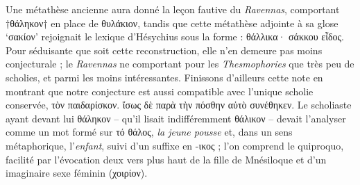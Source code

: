 \documentclass[12pt]{book}%
\newcommand{\italique}[1]{\textit{#1}}%
\newcommand{\citComm}[1]{\begin{quoting}[vskip=0pt] #1 \end{quoting}}%
\newcommand{\francais}[1]{{\policeFr #1}}%
\newcommand{\marqueur}[1]{\textsuperscript{#1}}%
\newenvironment{groupe}{%
\pstart%
\ledgroup%
}{%
\pend %
}%
\begin{document}
\begin{pages}
\begin{Leftside}
\begin{groupe}
{{Une métathèse ancienne aura donné la leçon fautive du \italique{Ravennas}, comportant †θάληκον† en place de θυλάκιον, tandis que cette métathèse adjointe à sa glose `σακίον' rejoignait le lexique d'Hésychius sous la forme : θάλλικα· σάκκου εἶδος. 
Pour séduisante que soit cette reconstruction, elle n'en demeure pas moins conjecturale ; le \italique{Ravennas} ne comportant pour les \italique{Thesmophories} que très peu de scholies, et parmi les moins intéressantes.
Finissons d'ailleurs cette note en montrant que notre conjecture est aussi compatible avec l'unique scholie conservée, τὸν παιδαρίσκον. ἴσως δὲ παρὰ τὴν πόσθην αὐτὸ συνέθηκεν. Le scholiaste ayant devant lui θάληκον -- qu'il lisait indifféremment θάλικον -- devait l'analyser comme un mot formé sur τό θάλος, \italique{la jeune pousse} et, dans un sens métaphorique, l'\italique{enfant}, suivi d'un suffixe en -ικος ; l'on comprend le quiproquo, facilité par l'évocation deux vers plus haut de la fille de Mnésiloque et d'un imaginaire sexe féminin (χοιρίον).
}}
\end{groupe}
\end{Leftside}
\end{pages}
\end{document}
